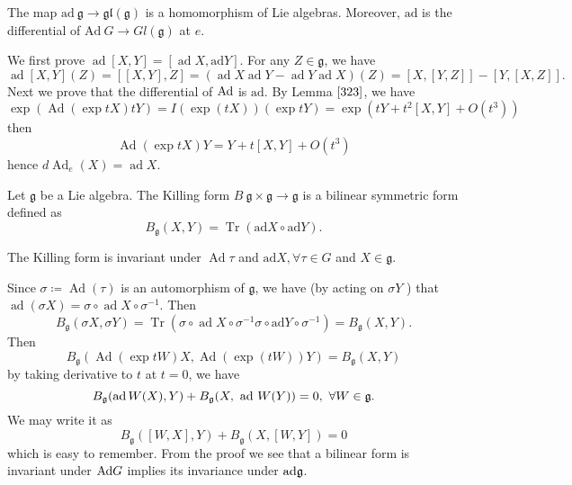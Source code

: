 \begin{theorem}
	The map  $\mathrm{ad}\:\mathfrak{g} \rightarrow
	\mathfrak{gl}(\mathfrak{g})$ is a homomorphism of Lie
	algebras. Moreover,  $\mathrm{ad}$ is the differential of
	$\mathrm{Ad}\: {G} \rightarrow {Gl}(\mathfrak{g})$ at $e .$

\end{theorem}
\bproof
We first prove $\operatorname{ad}[X, Y]=[\operatorname{ad} X, 
\mathrm{ad} Y]$.  For any $Z \in \mathfrak{g}$, we have
$$\operatorname{ad}[X, Y](Z)=[[X, Y], Z]=(\operatorname{ad} X
\operatorname{ad} Y-\operatorname{ad} Y \operatorname{ad}
X)(Z)=[X,[Y, Z]]-[Y,[X,Z]].$$
Next we prove that the differential of $\mathrm{Ad}$ is $\mathrm{ad}$. By
Lemma $\ref{323}$, we
have  $$\exp (\operatorname{Ad}(\exp t X) t Y) = I(\exp (t
X))(\exp t Y) = \exp \left( t Y+t^{2}[X, Y]+O\left( t^{3} \right)
\right)$$
then 
$$
\operatorname{Ad}(\exp t X) Y=Y+t[X, Y]+O\left( t^{3} \right)
$$
hence $d \operatorname{Ad}_{e}(X)=\operatorname{ad} X$.
\eproof
\begin{definition}
Let $\mathfrak{g}$ be a Lie algebra. The Killing form $B\:
\mathfrak{g} \times \mathfrak{g} \rightarrow \mathfrak{g}$ is a
bilinear symmetric form defined as
\[
B_{\mathfrak{g}}(X, Y)=\operatorname{Tr}(\mathrm{ad} {X} \circ
\mathrm{ad} {Y}).
\]	
\end{definition}

\begin{theorem}
	The Killing form is invariant under $\operatorname{Ad} \tau$
	and $\mathrm{ad} X, \forall \tau \in G$ and $X \in
	\mathfrak{g}$.
	
\end{theorem}
\bproof
Since $\sigma \coloneq  \operatorname{Ad}(\tau)$ is an automorphism of
$\mathfrak{g}$, we have (by acting on $\sigma Y$ ) that
$\operatorname{ad}(\sigma X) = \sigma \circ \operatorname{ad} X
\circ \sigma^{-1}$. Then
\[
B_{\mathfrak{g}}(\sigma X, \sigma Y) =
\operatorname{Tr}\left(\sigma \circ \operatorname{ad} X \circ
\sigma^{-1} \sigma \circ \mathrm{ad} Y \circ \sigma^{-1}\right) =
B_{\mathfrak{g}}(X, Y).
\]
Then
\[
B_{\mathfrak{g}}(\operatorname{Ad}(\exp t W) X,
\operatorname{Ad}(\exp (t W)) Y) = B_{\mathfrak{g}}(X, Y)
\]
 by taking derivative to $t$ at $t = 0$, we have
\[
B_{\mathfrak{g}}(\operatorname{ad} W(X), Y) + B_{\mathfrak{g}}(X,
\text { ad } W(Y)) = 0,\ \forall W \in {\mathfrak g}.
\]
We may write it as
\[
B_{\mathfrak{g}}([W, X], Y) + B_{\mathfrak{g}}(X, [W, Y]) = 0
\]
which is easy to remember.
\eproof
From the proof we see that a bilinear form is invariant under
$\mathrm{Ad} G$ implies its invariance under $\mathrm{ad}{\mathfrak g}$.

